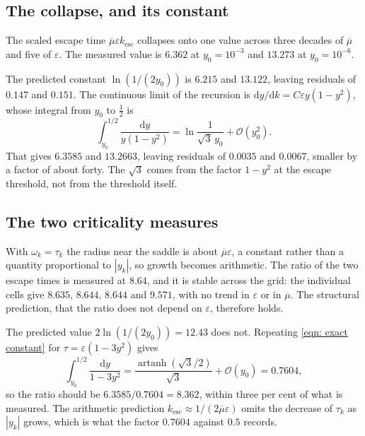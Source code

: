 \documentclass[11pt,a4paper]{article}
\providecommand{\calO}{{\mathcal{O}}}
\providecommand{\abs}[1]{\left \vert #1 \right \vert}
\theoremstyle{definition}
\theoremstyle{remark}
\begin{document}
\subsection{The collapse, and its constant}\label{sec: collapse}

The scaled escape time $\overline{\mu}\varepsilon k_{\mathrm{esc}}$ collapses
onto one value across three decades of $\overline{\mu}$ and five of
$\varepsilon$. The measured value is $6.362$ at $y_0 = 10^{-3}$ and $13.273$ at
$y_0 = 10^{-6}$.

The predicted constant $\ln(1/(2y_0))$ is $6.215$ and $13.122$, leaving
residuals of $0.147$ and $0.151$. The continuous limit of the recursion is
$\mathrm{d}y/\mathrm{d}k = C\varepsilon y(1-y^2)$, whose integral from $y_0$ to
$\tfrac12$ is
\begin{equation}
  \int_{y_0}^{1/2}\frac{\mathrm{d}y}{y(1-y^2)}
  = \ln\frac{1}{\sqrt3\,y_0} + \calO(y_0^2) .
  \label{eqn: exact constant}
\end{equation}
That gives $6.3585$ and $13.2663$, leaving residuals of $0.0035$ and $0.0067$,
smaller by a factor of about forty. The $\sqrt3$ comes from the factor $1-y^2$ at
the escape threshold, not from the threshold itself.

\subsection{The two criticality measures}\label{sec: measures}

With $\omega_k = \tau_k$ the radius near the saddle is about
$\overline{\mu}\varepsilon$, a constant rather than a quantity proportional to
$\abs{y_k}$, so growth becomes arithmetic. The ratio of the two escape times is
measured at $8.64$, and it is stable across the grid: the individual cells give
$8.635$, $8.644$, $8.644$ and $9.571$, with no trend in $\varepsilon$ or in
$\overline{\mu}$. The structural prediction, that the ratio does not depend on
$\varepsilon$, therefore holds.

The predicted value $2\ln(1/(2y_0)) = 12.43$ does not. Repeating
\eqref{eqn: exact constant} for $\tau = \varepsilon(1-3y^2)$ gives
\[
  \int_{y_0}^{1/2}\frac{\mathrm{d}y}{1-3y^2}
  = \frac{\operatorname{artanh}(\sqrt3/2)}{\sqrt3} + \calO(y_0)
  = 0.7604 ,
\]
so the ratio should be $6.3585/0.7604 = 8.362$, within three per cent of what is
measured. The arithmetic prediction $k_{\mathrm{esc}} \approx 1/(2\overline{\mu}
\varepsilon)$ omits the decrease of $\tau_k$ as $\abs{y_k}$ grows, which is what
the factor $0.7604$ against $0.5$ records.
\end{document}
